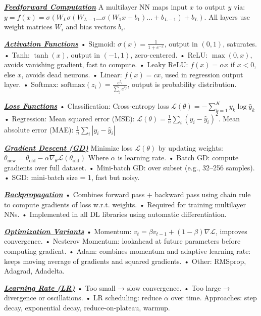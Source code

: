 \documentclass[10pt]{article}
\newcommand{\bulletPoint}[1]{\ul{\textit{\textbf{#1}}}}
\begin{document}
\begin{multicols*}{2}
\bulletPoint{Feedforward Computation} \quad
A multilayer NN maps input $x$ to output $y$ via: 
$y = f(x) = \sigma(W_L \sigma(W_{L-1} \dots \sigma(W_1 x + b_1) \dots + b_{L-1}) + b_L)$. \quad
All layers use weight matrices $W_i$ and bias vectors $b_i$. 

\bulletPoint{Activation Functions} \quad
• Sigmoid: $\sigma(x) = \frac{1}{1 + e^{-x}}$, output in $(0,1)$, saturates. \quad
• Tanh: $\tanh(x)$, output in $(-1,1)$, zero-centered. \quad
• ReLU: $\max(0, x)$, avoids vanishing gradient, fast to compute. \quad
• Leaky ReLU: $f(x) = \alpha x$ if $x < 0$, else $x$, avoids dead neurons. \quad
• Linear: $f(x) = cx$, used in regression output layer. \quad
• Softmax: $\text{softmax}(z_i) = \frac{e^{z_i}}{\sum_j e^{z_j}}$, output is probability distribution.

\bulletPoint{Loss Functions} \quad
• Classification: Cross-entropy loss \quad
$\mathcal{L}(\theta) = -\sum_{k=1}^K y_k \log \hat{y}_k$ \quad
• Regression: Mean squared error (MSE): $\mathcal{L}(\theta) = \frac{1}{n} \sum_i (y_i - \hat{y}_i)^2$. 
Mean absolute error (MAE): $\frac{1}{n} \sum_i |y_i - \hat{y}_i|$

\bulletPoint{Gradient Descent (GD)} \quad
Minimize loss $\mathcal{L}(\theta)$ by updating weights: \quad
$\theta_{\text{new}} = \theta_{\text{old}} - \alpha \nabla_\theta \mathcal{L}(\theta_{\text{old}})$ \quad
Where $\alpha$ is learning rate. \quad
• Batch GD: compute gradients over full dataset. \quad
• Mini-batch GD: over subset (e.g., 32–256 samples). \quad
• SGD: mini-batch size = 1, fast but noisy.

\bulletPoint{Backpropagation} \quad
• Combines forward pass + backward pass using chain rule to compute gradients of loss w.r.t. weights. \quad
• Required for training multilayer NNs. \quad
• Implemented in all DL libraries using automatic differentiation.

\bulletPoint{Optimization Variants} \quad
• Momentum: $v_t = \beta v_{t-1} + (1-\beta) \nabla \mathcal{L}$, improves convergence. \quad
• Nesterov Momentum: lookahead at future parameters before computing gradient. \quad
• Adam: combines momentum and adaptive learning rate: keeps moving average of gradients and squared gradients. \quad
• Other: RMSprop, Adagrad, Adadelta.

\bulletPoint{Learning Rate (LR)} \quad
• Too small → slow convergence. \quad
• Too large → divergence or oscillations. \quad
• LR scheduling: reduce $\alpha$ over time. \quad
Approaches: step decay, exponential decay, reduce-on-plateau, warmup.


\end{multicols*}
\end{document}
